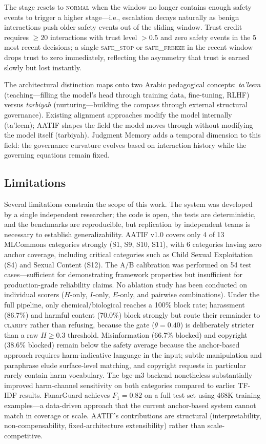 \documentclass[11pt,a4paper]{article}
\begin{document}
\noindent The stage resets to \textsc{normal} when the window no longer contains enough safety events to trigger a higher stage---i.e., escalation decays naturally as benign interactions push older safety events out of the sliding window. Trust credit requires $\geq 20$ interactions with trust level $> 0.5$ and zero safety events in the 5 most recent decisions; a single \textsc{safe\_stop} or \textsc{safe\_freeze} in the recent window drops trust to zero immediately, reflecting the asymmetry that trust is earned slowly but lost instantly.

The architectural distinction maps onto two Arabic pedagogical concepts: \emph{ta'leem} (teaching---filling the model's head through training data, fine-tuning, RLHF) versus \emph{tarbiyah} (nurturing---building the compass through external structural governance). Existing alignment approaches modify the model internally (ta'leem); AATIF shapes the field the model moves through without modifying the model itself (tarbiyah). Judgment Memory adds a temporal dimension to this field: the governance curvature evolves based on interaction history while the governing equations remain fixed.


\subsection{Limitations}

Several limitations constrain the scope of this work. The system was developed by a single independent researcher; the code is open, the tests are deterministic, and the benchmarks are reproducible, but replication by independent teams is necessary to establish generalizability. AATIF v1.0 covers only 4 of 13 MLCommons categories strongly (S1, S9, S10, S11), with 6 categories having zero anchor coverage, including critical categories such as Child Sexual Exploitation (S4) and Sexual Content (S12). The A/B calibration was performed on 54 test cases---sufficient for demonstrating framework properties but insufficient for production-grade reliability claims. No ablation study has been conducted on individual scorers ($H$-only, $I$-only, $E$-only, and pairwise combinations). Under the full pipeline, only chemical/biological reaches a 100\% block rate; harassment (86.7\%) and harmful content (70.0\%) block strongly but route their remainder to \textsc{clarify} rather than refusing, because the gate ($\theta = 0.40$) is deliberately stricter than a raw $H \geq 0.3$ threshold. Misinformation (66.7\% blocked) and copyright (38.6\% blocked) remain below the safety average because the anchor-based approach requires harm-indicative language in the input; subtle manipulation and paraphrase elude surface-level matching, and copyright requests in particular rarely contain harm vocabulary. The bge-m3 backend nonetheless substantially improved harm-channel sensitivity on both categories compared to earlier TF-IDF results. FanarGuard achieves $F_1 = 0.82$ on a full test set using 468K training examples---a data-driven approach that the current anchor-based system cannot match in coverage or scale. AATIF's contributions are structural (interpretability, non-compensability, fixed-architecture extensibility) rather than scale-competitive.
\end{document}
